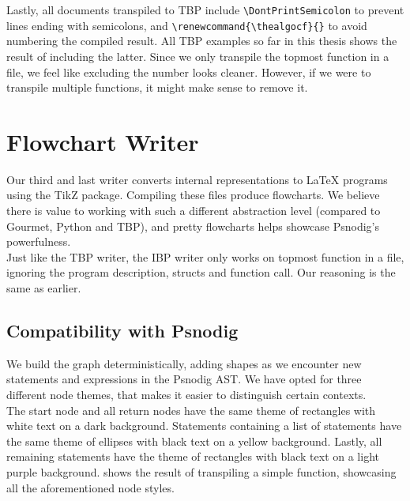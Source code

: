 Lastly, all documents transpiled to TBP include \texttt{\textbackslash DontPrintSemicolon} to prevent lines ending with semicolons, and \texttt{\textbackslash renewcommand\{\textbackslash thealgocf\}\{\}} to avoid numbering the compiled result. All TBP examples so far in this thesis shows the result of including the latter. Since we only transpile the topmost function in a file, we feel like excluding the number looks cleaner. However, if we were to transpile multiple functions, it might make sense to remove it.

\section{Flowchart Writer}

Our third and last writer converts internal representations to LaTeX programs using the TikZ package. Compiling these files produce flowcharts. We believe there is value to working with such a different abstraction level (compared to Gourmet, Python and TBP), and pretty flowcharts helps showcase Psnodig's powerfulness. \\

Just like the TBP writer, the IBP writer only works on topmost function in a file, ignoring the program description, structs and function call. Our reasoning is the same as earlier.

\subsection{Compatibility with Psnodig}

We build the graph deterministically, adding shapes as we encounter new statements and expressions in the Psnodig AST. We have opted for three different node themes, that makes it easier to distinguish certain contexts. \\

The start node and all return nodes have the same theme of rectangles with white text on a dark background. Statements containing a list of statements have the same theme of ellipses with black text on a yellow background. Lastly, all remaining statements have the theme of rectangles with black text on a light purple background.  shows the result of transpiling a simple function, showcasing all the aforementioned node styles. \\

